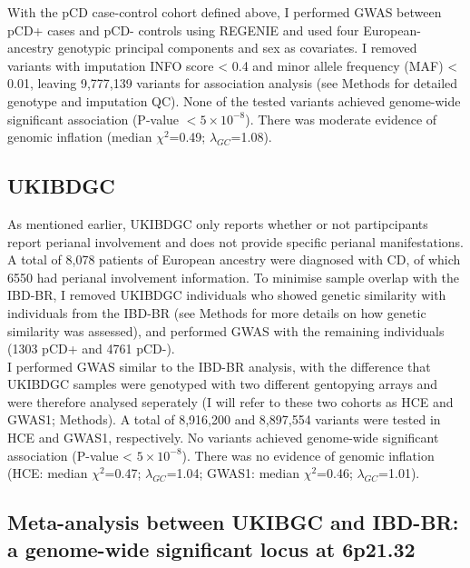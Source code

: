 With the pCD case-control cohort defined above, I performed GWAS between pCD+ cases and pCD- controls using REGENIE and used four European-ancestry genotypic principal components and sex as covariates. I removed variants with imputation INFO score < 0.4 and minor allele frequency (MAF) < 0.01, leaving 9,777,139 variants for association analysis (see Methods for detailed genotype and imputation QC). None of the tested variants achieved genome-wide significant association (P-value $< 5\times10^{-8}$). There was moderate evidence of genomic inflation (median $\chi^{2}$=0.49; $\lambda_{GC}$=1.08).
\subsection{UKIBDGC}
As mentioned earlier, UKIBDGC only reports whether or not partipcipants report perianal involvement and does not provide specific perianal manifestations. A total of 8,078 patients of European ancestry were diagnosed with CD, of which 6550 had perianal involvement information. To minimise sample overlap with the IBD-BR, I removed UKIBDGC individuals who showed genetic similarity with individuals from the IBD-BR (see Methods for more details on how genetic similarity was assessed), and performed GWAS with the remaining individuals (1303 pCD+ and 4761 pCD-). \\

I performed GWAS similar to the IBD-BR analysis, with the difference that UKIBDGC samples were genotyped with two different gentopying arrays and were therefore analysed seperately (I will refer to these two cohorts as HCE and GWAS1; Methods). A total of 8,916,200 and 8,897,554 variants were tested in HCE and GWAS1, respectively. No variants achieved genome-wide significant association (P-value < $5\times10^{-8}$). There was no evidence of genomic inflation (HCE: median $\chi^{2}$=0.47; $\lambda_{GC}$=1.04; GWAS1: median $\chi^{2}$=0.46; $\lambda_{GC}$=1.01).

\subsection{Meta-analysis between UKIBGC and IBD-BR: a genome-wide significant locus at 6p21.32}

